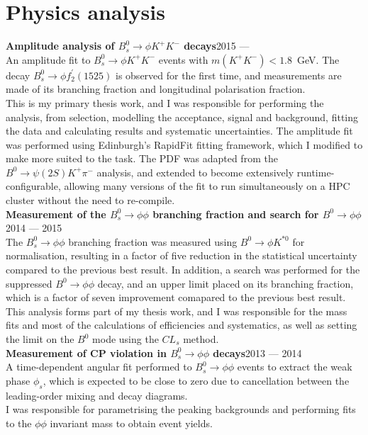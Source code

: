 \documentclass[contbibnum]{simplecv}
\newcommand\dateditem[2]{#1\hfill#2\\}
\newcommand\topictitle[3]{\dateditem{{\textbf{#1}}}{#3}#2}
\begin{document}
	\section{Physics analysis}
	\topictitle{Amplitude analysis of $B^0_s \to \phi K^{+}K^{-}$ decays}{}{2015 ---}
	An amplitude fit to ${B^0_s \to \phi K^{+}K^{-}}$ events with ${m(K^{+}K^{-})<1.8}$~GeV. The decay ${B^0_s \to \phi f_2^\prime(1525)}$ is observed for the first time, and measurements are made of its branching fraction and longitudinal polarisation fraction.
	\\[0.5em]
	This is my primary thesis work, and I was responsible for performing the analysis, from selection, modelling the acceptance, signal and background, fitting the data and calculating results and systematic uncertainties.
	The amplitude fit was performed using Edinburgh's RapidFit fitting framework, which I modified to make more suited to the task.
	The PDF was adapted from the $B^0 \to \psi(2S) K^{+} \pi^{-}$ analysis, and extended to become extensively runtime-configurable, allowing many versions of the fit to run simultaneously on a HPC cluster without the need to re-compile.
	\\[0.5em]
	\topictitle{Measurement of the $B^0_s \to \phi\phi$ branching fraction and search for $B^0 \to \phi \phi$}{}{2014 --- 2015}
	The $B^0_s \to \phi\phi$ branching fraction was measured using $B^0 \to \phi K^{*0}$ for normalisation, resulting in a factor of five reduction in the statistical uncertainty compared to the previous best result.
	In addition, a search was performed for the suppressed $B^0 \to \phi\phi$ decay, and an upper limit placed on its branching fraction, which is a factor of seven improvement comapared to the previous best result.
	\\[0.5em]
	This analysis forms part of my thesis work, and I was responsible for the mass fits and most of the calculations of efficiencies and systematics, as well as setting the limit on the $B^0$ mode using the $CL_s$ method.
	\\[0.5em]
	\topictitle{Measurement of CP violation in $B^0_s \to \phi\phi$ decays}{}{2013 --- 2014}
	A time-dependent angular fit performed to $B^0_s \to \phi\phi$ events to extract the weak phase $\phi_s$, which is expected to be close to zero due to cancellation between the leading-order mixing and decay diagrams.
	\\[0.5em]
	I was responsible for parametrising the peaking backgrounds and performing fits to the $\phi\phi$ invariant mass to obtain event yields.
\end{document}
